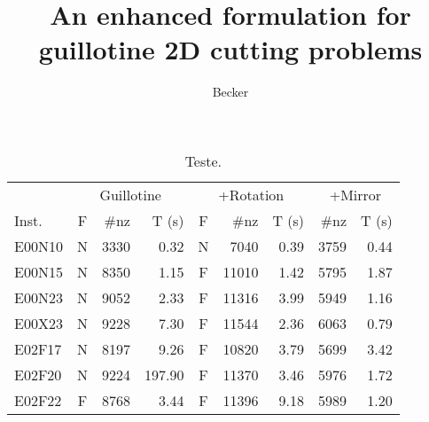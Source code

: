 \documentclass[ppgc,tese,english,formais,babel]{iiufrgs}
\title{An enhanced formulation for guillotine 2D cutting problems
}
\author{Becker}{Henrique}
\begin{document}
\begin{spacing}{1.0}
%
%
%
%
%
\begin{table}[H]
\centering
\caption{Teste.}
\label{tab:clautiaux42_joined}
\begin{tabular}{lcrrcrrrr}
\hline\hline
& \multicolumn{3}{c}{Guillotine} & \multicolumn{3}{c}{+Rotation} & \multicolumn{2}{c}{+Mirror}\\ \cmidrule(lr){2-4}\cmidrule(lr){5-7}\cmidrule(lr){8-9}
\rowcolor{white} Inst. & F & \#nz & T (s) & F & \#nz & T (s) & \#nz & T (s) \\\hline %
E00N10 & N & 3330 & 0.32 & N & 7040 & 0.39 & 3759 & 0.44 \\
E00N15 & N & 8350 & 1.15 & F & 11010 & 1.42 & 5795 & 1.87 \\
E00N23 & N & 9052 & 2.33 & F & 11316 & 3.99 & 5949 & 1.16 \\
E00X23 & N & 9228 & 7.30 & F & 11544 & 2.36 & 6063 & 0.79 \\
E02F17 & N & 8197 & 9.26 & F & 10820 & 3.79 & 5699 & 3.42 \\
E02F20 & N & 9224 & 197.90 & F & 11370 & 3.46 & 5976 & 1.72 \\
E02F22 & F & 8768 & 3.44 & F & 11396 & 9.18 & 5989 & 1.20 \\

\end{tabular}
\end{table}
\end{spacing}
\end{document}

